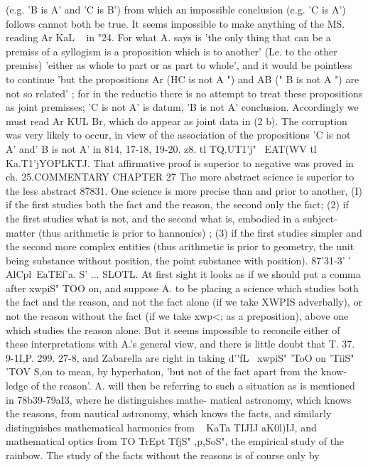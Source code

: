 {{{{{{{{{{{{{{{{{{{{{{{{{{{{{{{{{(e.g. 'B is A' and 'C is B') from which an impossible conclusion
(e.g. 'C is A') follows cannot both be true.
It seems impossible to make anything of the MS. reading Ar
KaL ~ in "24. For what A. says is 'the only thing that can be
a premiss of a syllogism is a proposition which is to another'
(Le. to the other premiss) 'either as whole to part or as part to
whole', and it would be pointless to continue 'but the propositions
Ar (HC is not A ") and AB (" B is not A ") are not so related' ; for
in the reductio there is no attempt to treat these propositions as
joint premisses; 'C is not A' is datum, 'B is not A' conclusion.
Accordingly we must read Ar KUL Br, which do appear as joint
data in (2 b). The corruption was very likely to occur, in view
of the association of the propositions 'C is not A' and' B is not A'
in 814, 17-18, 19-20.
z8. tl TQ.UT1'j" ~EAT(WV tl Ka.T1'jYOPLKTJ. That affirmative proof
is superior to negative was proved in ch. 25.COMMENTARY
CHAPTER 27
The more abstract science is superior to the less abstract
87831. One science is more precise than and prior to another,
(I) if the first studies both the fact and the reason, the second
only the fact; (2) if the first studies what is not, and the second
what is, embodied in a subject-matter (thus arithmetic is prior
to hannonics) ; (3) if the first studies simpler and the second more
complex entities (thus arithmetic is prior to geometry, the unit
being substance without position, the point substance with
position).
87'31-3' ' AlCpl~EaTEf'a. S' ... SLOTL. At first sight it looks as
if we should put a comma after xwpiS" TOO on, and suppose A.
to be placing a science which studies both the fact and the reason,
and not the fact alone (if we take XWPIS adverbally), or not the
reason without the fact (if we take xwp{<; as a preposition), above
one which studies the reason alone. But it seems impossible to
reconcile either of these interpretations with A.'s general view,
and there is little doubt that T. 37. 9-1I,P. 299. 27-8, and
Zabarella are right in taking d'\'\a fL~ xwpiS" 'ToO on 'TiiS" 'TOV S,on to
mean, by hyperbaton, 'but not of the fact apart from the know-
ledge of the reason'. A. will then be referring to such a situation
as is mentioned in 78b39-79aI3, where he distinguishes mathe-
matical astronomy, which knows the reasons, from nautical
astronomy, which knows the facts, and similarly distinguishes
mathematical harmonics from ~ KaTa TIJIJ aK0l)IJ, and mathematical
optics from TO TrEpt TfjS" ,p,SoS", the empirical study of the rainbow.
The study of the facts without the reasons is of course only by
}}}}}}}}}}}}}}}}}}}}}}}}}}}}}}}}}}
